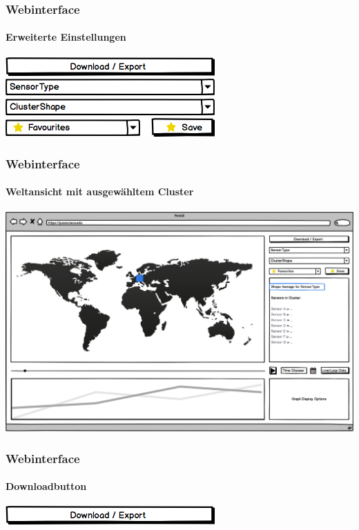 \documentclass{beamer}
\begin{document}
\begin{frame}
	\frametitle{Webinterface}
	\framesubtitle{Erweiterte Einstellungen}
	\centering
	\includegraphics[width=0.5\linewidth]{gui/frontend/FrontGUIDownloadButton}\\[2mm]
	\includegraphics[width=0.5\linewidth]{gui/frontend/FrontGUISensorType}\\[2mm]
	\includegraphics[width=0.5\linewidth]{gui/frontend/FrontGUIShapeType}\\[2mm]
	\includegraphics[width=0.5\linewidth]{gui/frontend/FrontGUIFavourites}
\end{frame}

\begin{frame}
	\frametitle{Webinterface}
	\framesubtitle{Weltansicht mit ausgewähltem Cluster}
	\centering
	\includegraphics[width=\linewidth]{gui/frontend/FrontGUIWorldWithShapeSelection}
\end{frame}

\begin{frame}
	\frametitle{Webinterface}
	\framesubtitle{Downloadbutton}
	\centering
	\includegraphics[width=0.5\linewidth]{gui/frontend/FrontGUIDownloadbutton}
\end{frame}
\end{document}
